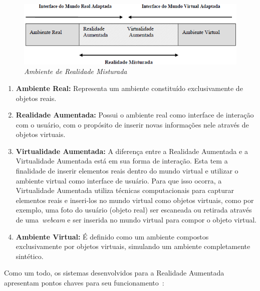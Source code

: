 	\begin{figure}[htb]
		\centering \includegraphics[scale=.8]{figuras/cap2/rv.jpg}
		\caption{\textit{Ambiente de Realidade Misturada ~\cite{kernerTori}}}
		\label{fig:diagramaRV} 
	\end{figure}
	
	\begin{enumerate}
	  \item \textbf{Ambiente Real:} Representa um ambiente constituído exclusivamente de objetos reais. 
	
	  \item \textbf{Realidade Aumentada:} Possui o ambiente real como interface de interação com o
	  usuário, com o propósito de inserir novas informações nele através de objetos virtuais.

	  \item \textbf{Virtualidade Aumentada:} A diferença entre a Realidade Aumentada e a Virtualidade
	  Aumentada está em sua forma de interação. Esta tem a finalidade de inserir elementos reais dentro
	  do mundo virtual e utilizar o ambiente virtual como interface de usuário. Para que isso ocorra, a
	  Virtualidade Aumentada utiliza técnicas computacionais para capturar elementos reais e inseri-los
	  no mundo virtual como objetos virtuais, como por exemplo, uma foto do usuário (objeto real) ser 
	  escaneada ou retirada através de uma~\textit{webcam} e ser inserida no mundo virtual para compor o
	  objeto virtual.

	  \item \textbf{Ambiente Virtual:} É definido como um ambiente compostos exclusivamente por objetos
	  virtuais, simulando um ambiente completamente sintético.
	
	\end{enumerate}
	
	Como um todo, os sistemas desenvolvidos para a Realidade Aumentada apresentam pontos chaves para
	seu funcionamento~\cite{henrysson}:
	
